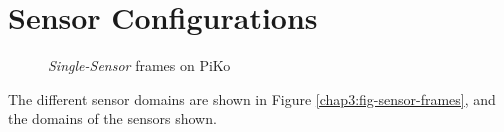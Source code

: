 \section{Sensor Configurations}
\label{chap3:sec-sensorconfig}
\begin{figure}[htbp]
    \centering
    \caption{\emph{Single-Sensor} frames on PiKo}
    \label{chap3:fig-single-sensor-frames}
\end{figure}
The different sensor domains are shown in Figure \ref{chap3:fig-sensor-frames}, and the
domains of the sensors shown. 


